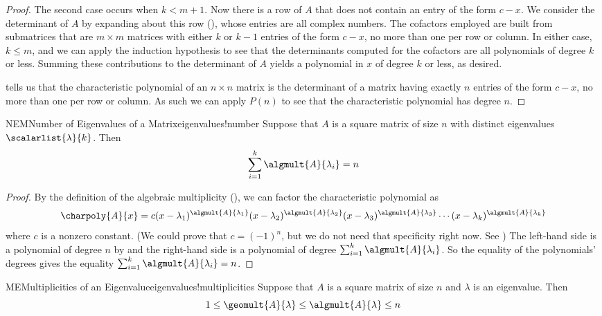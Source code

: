 \begin{proof}
%
The second case occurs when $k<m+1$.  Now there is a row of $A$ that does not contain an entry of the form $c-x$.  We consider the determinant of $A$ by expanding about this row (), whose entries are all complex numbers.  The cofactors employed are built from submatrices that are $m\times m$ matrices with either $k$ or $k-1$ entries of the form $c-x$, no more than one per row or column.  In either case, $k\leq m$, and we can apply the induction hypothesis to see that the determinants computed for the cofactors are all polynomials of degree $k$ or less.  Summing these contributions to the determinant of $A$ yields a polynomial in $x$ of degree $k$ or less, as desired.\par
%
 tells us that the characteristic polynomial of an $n\times n$ matrix is the determinant of a matrix having exactly $n$ entries of the form $c-x$, no more than one per row or column.  As such we can apply $P(n)$ to see that the characteristic polynomial has degree $n$.
%
\end{proof}
%
\begin{theorem}{NEM}{Number of Eigenvalues of a Matrix}{eigenvalues!number}
Suppose that $A$ is a square matrix of size $n$ with distinct eigenvalues $\scalarlist{\lambda}{k}$.  Then
%
\begin{equation*}
\sum_{i=1}^{k}\algmult{A}{\lambda_i}=n
\end{equation*}
%
\end{theorem}
%
\begin{proof}
By the definition of the algebraic multiplicity (), we can factor the characteristic polynomial as
%
\begin{equation*}
\charpoly{A}{x}=c(x-\lambda_1)^{\algmult{A}{\lambda_1}}(x-\lambda_2)^{\algmult{A}{\lambda_2}}(x-\lambda_3)^{\algmult{A}{\lambda_3}}\cdots(x-\lambda_k)^{\algmult{A}{\lambda_k}}
\end{equation*}
%
where $c$ is a nonzero constant.  (We could prove that $c=(-1)^{n}$, but we do not need that specificity right now.  See )  The left-hand side is a polynomial of degree $n$ by  and the right-hand side is a polynomial of degree $\sum_{i=1}^{k}\algmult{A}{\lambda_i}$.  So the equality of the polynomials' degrees gives the equality $\sum_{i=1}^{k}\algmult{A}{\lambda_i}=n$.
\end{proof}
%
\begin{theorem}{ME}{Multiplicities of an Eigenvalue}{eigenvalues!multiplicities}
Suppose that $A$ is a square matrix of size $n$ and $\lambda$ is an eigenvalue.  Then
%
\begin{equation*}
1\leq\geomult{A}{\lambda}\leq\algmult{A}{\lambda}\leq n
\end{equation*}
%
\end{theorem}
